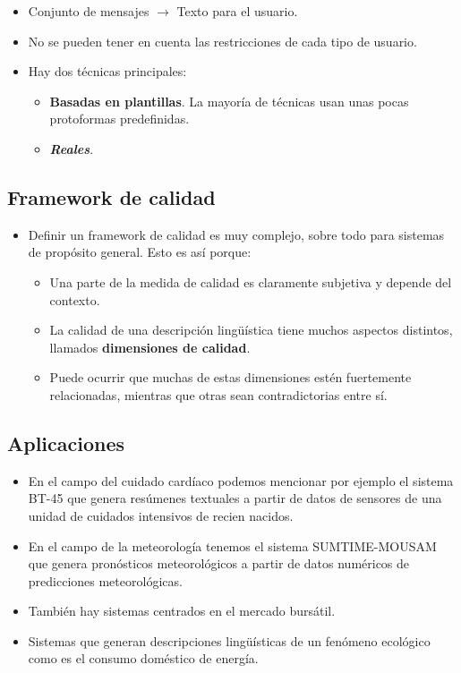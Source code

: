 \documentclass{beamer}
\begin{document}
	\begin{frame}
		\begin{itemize}
			\item Conjunto de mensajes $\longrightarrow$ Texto para el usuario.
			\item No se pueden tener en cuenta las restricciones de cada tipo de usuario.
			\item Hay dos técnicas principales:
				\begin{itemize}
					\item \textbf{Basadas en plantillas}. La mayoría de técnicas usan unas pocas protoformas predefinidas.
					\item \textbf{\textit{Reales}}.
				\end{itemize}
		\end{itemize}
	\end{frame}
	
	\subsection{Framework de calidad}
	
	\begin{frame}
		\begin{itemize}
			\item Definir un framework de calidad es muy complejo, sobre todo para sistemas de propósito general. Esto es así porque:
			\begin{itemize}
				\item Una parte de la medida de calidad es claramente subjetiva y depende del contexto.
				\item La calidad de una descripción lingüística tiene muchos aspectos distintos, llamados \textbf{dimensiones de calidad}.
				\item Puede ocurrir que muchas de estas dimensiones estén fuertemente relacionadas, mientras que otras sean contradictorias entre sí.
			\end{itemize}
		\end{itemize}		
	\end{frame}
	
	\subsection{Aplicaciones}
	
	\begin{frame}
		\begin{itemize}
			\item En el campo del cuidado cardíaco podemos mencionar por ejemplo el sistema BT-45 que genera resúmenes textuales a partir de datos de sensores de una unidad de cuidados intensivos de recien nacidos.
			\item En el campo de la meteorología tenemos el sistema SUMTIME-MOUSAM que genera pronósticos meteorológicos a partir de datos numéricos de predicciones meteorológicas.
			\item También hay sistemas centrados en el mercado bursátil.
			\item Sistemas que generan descripciones lingüísticas de un fenómeno ecológico como es el consumo doméstico de energía.
\end{itemize}
	\end{frame}
	
\end{document}
